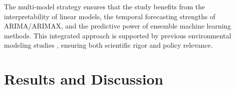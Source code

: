 \documentclass[10pt,letterpaper]{article}
\begin{document}
The multi-model strategy ensures that the study benefits from the interpretability of linear models, the temporal forecasting strengths of ARIMA/ARIMAX, and the predictive power of ensemble machine learning methods. This integrated approach is supported by previous environmental modeling studies \cite{wang2024ecological, liu2023application}, ensuring both scientific rigor and policy relevance.
%
%


\section{Results and Discussion}
\label{sec:results}
\end{document}
